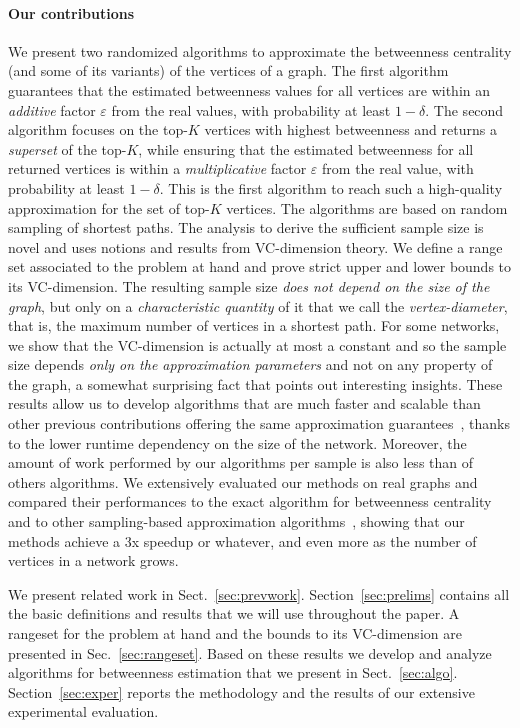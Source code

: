 \paragraph{Our contributions} 
We present two randomized algorithms to approximate the betweenness centrality
(and some of its variants) of the vertices of a graph. The first algorithm
guarantees that the estimated betweenness values for all vertices are within an
\emph{additive} factor $\varepsilon$ from the real values, with probability at
least $1-\delta$. The second algorithm focuses on the top-$K$ vertices with
highest betweenness and returns a \emph{superset} of the top-$K$,
while ensuring that the estimated betweenness for all returned vertices is
within a \emph{multiplicative} factor $\varepsilon$ from the real value, with
probability at least $1-\delta$. This is the first algorithm to reach such a
high-quality approximation for the set of top-$K$ vertices. The algorithms are
based on random sampling of shortest paths. The analysis to derive the
sufficient sample size is novel and uses notions and results from VC-dimension
theory. We define a range set associated to the problem at hand and prove strict
upper and lower bounds to its VC-dimension. The resulting sample size \emph{does not
depend on the size of the graph}, but only on a \emph{characteristic quantity} of it
that we call the \emph{vertex-diameter}, that is, the maximum number of vertices
in a shortest path. For some networks, we show that the VC-dimension is actually
at most a constant and so the sample size depends \emph{only on the approximation
parameters} and not on any property of the graph, a somewhat surprising fact
that points out interesting insights. These results allow us to develop
algorithms that are much faster and scalable than other previous contributions
offering the same approximation
guarantees~\citep{JacobKLPT05,BrandesP07,GeisbergeSS08}, thanks to the lower
runtime dependency on the size of the network. Moreover, the amount of work
performed by our algorithms per sample is also less than of others algorithms.
We extensively evaluated our methods on real graphs and compared their
performances to the exact algorithm for betweenness centrality~\citep{Brandes01}
and to other sampling-based approximation
algorithms~\citep{JacobKLPT05,BrandesP07,GeisbergerSS08}, showing that our
methods achieve a 3x speedup \XXX or whatever, and even more as the number of
vertices in a network grows.

We present related work in Sect.~\ref{sec:prevwork}. Section~\ref{sec:prelims}
contains all the basic definitions and results that we will use throughout the
paper. A rangeset for the problem at hand and the bounds to its VC-dimension
are presented in Sec.~\ref{sec:rangeset}. Based on these results we develop and
analyze algorithms for betweenness estimation that we present in
Sect.~\ref{sec:algo}. Section~\ref{sec:exper} reports the methodology and
the results of our extensive experimental evaluation.

